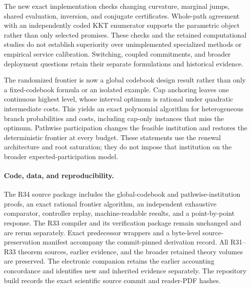 \documentclass[11pt,letterpaper]{article}
\theoremstyle{definition}\newtheorem{assumption}[theorem]{Assumption}
\begin{document}
The new exact implementation checks changing curvature, marginal jumps, shared evaluation, inversion, and conjugate certificates. Whole-path agreement with an independently coded KKT enumerator supports the parametric object rather than only selected promises. These checks and the retained computational studies do not establish superiority over unimplemented specialized methods or empirical service calibration. Switching, coupled commitments, and broader deployment questions retain their separate formulations and historical evidence.

The randomized frontier is now a global codebook design result rather than only a fixed-codebook formula or an isolated example. Cap anchoring leaves one continuous highest level, whose interval optimum is rational under quadratic intermediate costs. This yields an exact polynomial algorithm for heterogeneous branch probabilities and costs, including cap-only instances that miss the optimum. Pathwise participation changes the feasible institution and restores the deterministic frontier at every budget. These statements use the renewal architecture and root saturation; they do not impose that institution on the broader expected-participation model.

\paragraph{Code, data, and reproducibility.}
The R34 source package includes the global-codebook and pathwise-institution proofs, an exact rational frontier algorithm, an independent exhaustive comparator, controller replay, machine-readable results, and a point-by-point response. The R33 compiler and its verification package remain unchanged and are rerun separately. Exact predecessor wrappers and a byte-level source-preservation manifest accompany the commit-pinned derivation record. All R31--R33 theorem sources, earlier evidence, and the broader retained theory volumes are preserved. The electronic companion retains the earlier accounting concordance and identifies new and inherited evidence separately. The repository build records the exact scientific source commit and reader-PDF hashes.

\clearpage



\end{document}
